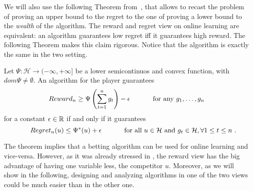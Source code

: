 We will also use the following Theorem from~\citet{McMahanO14}, that allows to recast the problem of proving an upper bound to the regret to the one of proving a lower bound to the \emph{wealth} of the algorithm.
The reward and regret view on online learning are equivalent: an algorithm guarantees low regret iff it guarantees high reward. The following Theorem makes this claim rigorous. Notice that the algorithm is exactly the same in the two setting.
\begin{theorem}
  \label{thm:rrdual}
  Let $\Psi:\mathcal{H} \rightarrow (-\infty, +\infty]$ be a lower semicontinuos and convex function, with $dom \Psi \neq \emptyset$. An
  algorithm for the player guarantees
  \[
  Reward_n \geq \Psi\left(\sum_{t=1}^n g_t\right) - \epsilon \quad \quad \quad \textnormal{ for any } g_1, \dots, g_n
  \]
  for a constant $\epsilon \in \mathbb{R}$ if and only if it
  guarantees
  \begin{equation}\label{eq:regb}
  \qquad Regret_n(u) \leq \Psi^*(u) + \epsilon \quad \quad \quad \textnormal{ for all } u \in \mathcal{H} \textnormal{ and } g_t \in \mathcal{H}, \forall 1\leq t\leq n~.
  \end{equation}
\end{theorem}
The theorem implies that a betting algorithm can be used for online learning and vice-versa. However, as it was already stressed in \citet{McMahanO14}, the reward view has the big advantage of having one variable less, the competitor $u$.
Moreover, as we will show in the following, designing and analyzing algorithms in one of the two views could be much easier than in the other one.

